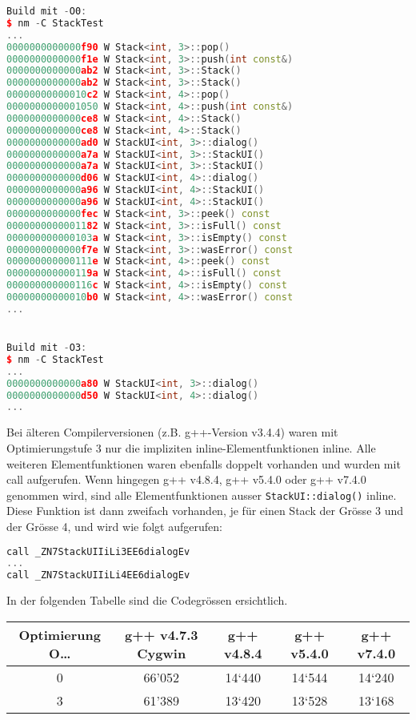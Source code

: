 \begin{enumerate}
\begin{lstlisting}[language=C++, style=C++, multicols=2]
Build mit -O0:
$ nm -C StackTest
...
0000000000000f90 W Stack<int, 3>::pop()
0000000000000f1e W Stack<int, 3>::push(int const&)
0000000000000ab2 W Stack<int, 3>::Stack()
0000000000000ab2 W Stack<int, 3>::Stack()
00000000000010c2 W Stack<int, 4>::pop()
0000000000001050 W Stack<int, 4>::push(int const&)
0000000000000ce8 W Stack<int, 4>::Stack()
0000000000000ce8 W Stack<int, 4>::Stack()
0000000000000ad0 W StackUI<int, 3>::dialog()
0000000000000a7a W StackUI<int, 3>::StackUI()
0000000000000a7a W StackUI<int, 3>::StackUI()
0000000000000d06 W StackUI<int, 4>::dialog()
0000000000000a96 W StackUI<int, 4>::StackUI()
0000000000000a96 W StackUI<int, 4>::StackUI()
0000000000000fec W Stack<int, 3>::peek() const
0000000000001182 W Stack<int, 3>::isFull() const
000000000000103a W Stack<int, 3>::isEmpty() const
0000000000000f7e W Stack<int, 3>::wasError() const
000000000000111e W Stack<int, 4>::peek() const
000000000000119a W Stack<int, 4>::isFull() const
000000000000116c W Stack<int, 4>::isEmpty() const
00000000000010b0 W Stack<int, 4>::wasError() const
...


Build mit -O3:
$ nm -C StackTest
...
0000000000000a80 W StackUI<int, 3>::dialog()
0000000000000d50 W StackUI<int, 4>::dialog()
...
\end{lstlisting}
Bei älteren Compilerversionen (z.B. g++-Version v3.4.4) waren mit Optimierungstufe 3 nur die impliziten inline-Elementfunktionen inline. Alle weiteren Elementfunktionen waren ebenfalls doppelt vorhanden und wurden mit call aufgerufen. Wenn hingegen g++ v4.8.4, g++ v5.4.0 oder g++ v7.4.0 genommen wird, sind alle Elementfunktionen ausser \texttt{StackUI::dialog()} inline. Diese Funktion ist dann zweifach vorhanden, je für einen Stack der Grösse 3 und der Grösse 4, und wird wie folgt aufgerufen:

\begin{lstlisting}[language=C++, style=C++]
call _ZN7StackUIIiLi3EE6dialogEv
...
call _ZN7StackUIIiLi4EE6dialogEv
\end{lstlisting}
In der folgenden Tabelle sind die Codegrössen ersichtlich.
\begin{center}
  \begin{tabular}{c c c c c}
    \hline
    \hline
    Optimierung O… & g++ v4.7.3 Cygwin & g++ v4.8.4  & g++ v5.4.0 & g++ v7.4.0 \\
    \hline
    0 &
66'052&
14‘440&
14‘544&
14‘240\\
3&
61'389&
13‘420&
13‘528&
13‘168\\
    \hline
    \hline
  \end{tabular}
\end{center}
\end{enumerate}

